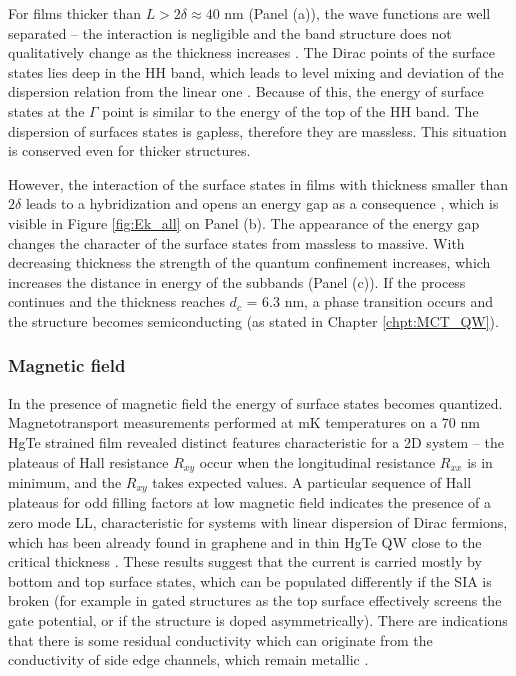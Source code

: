 \documentclass[titlepage,a4paper]{book}
\newcommand{\wciecie}{\quad\phantom{v}}
\begin{document}
For films thicker than $L > 2\delta \approx 40$ nm (Panel (a)), the wave functions are well separated -- the interaction is negligible and the band structure does not qualitatively change as the thickness increases \cite{Baum_MCT_layers}. The Dirac points of the surface states lies deep in the HH band, which leads to level mixing and deviation of the dispersion relation from the linear one \cite{Ganichev_MCT_layers}. Because of this, the energy of surface states at the $\Gamma$ point is similar to the energy of the top of the HH band. The dispersion of surfaces states is gapless, therefore they are massless. This situation is conserved even for thicker structures. 

However, the interaction of the surface states in films with thickness smaller than $2\delta$ leads to a hybridization and opens an energy gap as a consequence \cite{Baum_MCT_layers}, which is visible in Figure \ref{fig:Ek_all} on Panel (b). The appearance of the energy gap changes the character of the surface states from massless to massive. With decreasing thickness the strength of the quantum confinement increases, which increases the distance in energy of the subbands (Panel (c)). If the process continues and the thickness reaches $d_c$ = 6.3 nm, a phase transition occurs and the structure becomes semiconducting (as stated in Chapter \ref{chpt:MCT_QW}). 

\subsubsection{Magnetic field}
\wciecie
In the presence of magnetic field the energy of surface states becomes quantized. Magnetotransport measurements performed at mK temperatures \cite{Brune_State2} on a 70 nm HgTe strained film revealed distinct features characteristic for a 2D system -- the plateaus of Hall resistance $R_{xy}$ occur when the longitudinal resistance $R_{xx}$ is in minimum, and the $R_{xy}$ takes expected values. A particular sequence of Hall plateaus for odd filling factors at low magnetic field indicates the presence of a zero mode LL, characteristic for systems with linear dispersion of Dirac fermions, which has been already found in graphene \cite{Castro_graphene} and in thin HgTe QW close to the critical thickness \cite{Zholudev_MCT_QW}. These results suggest that the current is carried mostly by bottom and top surface states, which can be populated differently if the SIA is broken (for example in gated structures as the top surface effectively screens the gate potential, or if the structure is doped asymmetrically). There are indications that there is some residual conductivity which can originate from the conductivity of side edge channels, which remain metallic \cite{Chu_MCT_layers}. 
\end{document}
